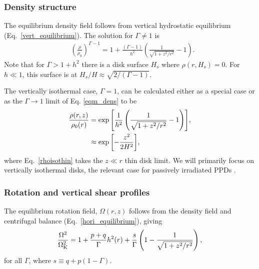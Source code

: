 \subsubsection{Density structure}
The equilibrium density field follows from vertical hydrostatic equilibrium (Eq.\ \ref{vert_equilibrium}).
The solution for $\Gamma\neq1$ is
\begin{align}\label{eqm_dens}
  &\left(\frac{\rho}{\rho_0}\right)^{\Gamma-1} = 1 +
  \frac{\left(\Gamma-1\right)}{ h^2}\left(\frac{1}{\sqrt{1+z^2/r^2}}-1\right).
\end{align}
Note that for $\Gamma > 1 +  h^2$ there is a disk surface $H_s$
where $\rho(r,H_s)=0$.  For $h \ll 1$, this surface is at $H_s/H \approx \sqrt{2/(\Gamma-1)}$.

The vertically isothermal case, $\Gamma = 1$, can be calculated either 
as a special case or as the $\Gamma \rightarrow 1$ limit of Eq. \ref{eqm_dens} to be 
\begin{subequations}\begin{align}
  \frac{\rho(r,z)}{\rho_0(r)} &=
  \exp{\left[\frac{1}{ h^2}\left(\frac{1}{\sqrt{1+z^2/r^2}}-1\right)\right]},   \\
  & \approx \exp {\left[ - {z^2 \over 2 H^2}\right]} \label{rhoisothin},
  \end{align}\end{subequations}
  where Eq.\ \ref{rhoisothin} takes the $z \ll r$ thin disk limit.  We will primarily focus on
vertically isothermal disks, the relevant case for passively irradiated
PPDs \citep{chiang97}. 

 
 \subsubsection{Rotation and vertical shear profiles}\label{vshear_def}
The equilibrium rotation field, $\Omega(r,z)$ follows from the density field and centrifugal balance (Eq.\ \ref{hori_equilibrium}),
giving 
\begin{align}\label{eqm_rot}
  \frac{\Omega^2}{\Omega_{\rm K}^2}=1 +
  \frac{p+q}{\Gamma} h^2(r) 
  +\frac{s}{\Gamma} \left(1-\frac{1}{\sqrt{1+z^2/r^2}}\right), 
\end{align}
for all $\Gamma$, where $s\equiv q+p(1-\Gamma)$.  

